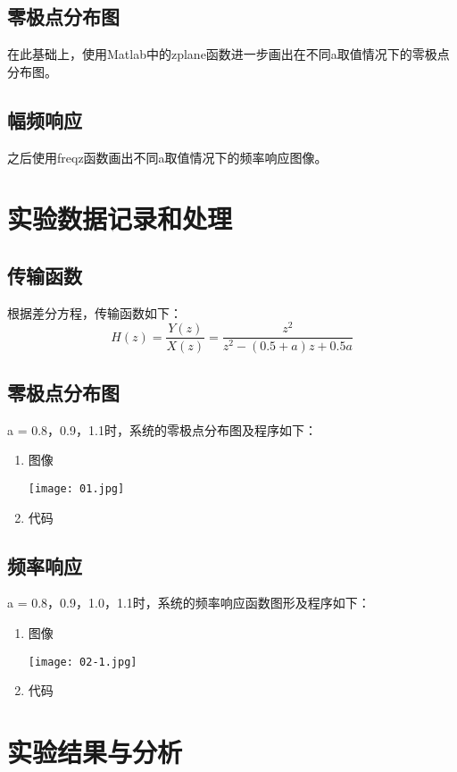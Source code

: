 \documentclass{hitreport}
\begin{document}
\subsection{零极点分布图}
在此基础上，使用Matlab中的zplane函数进一步画出在不同a取值情况下的零极点分布图。
\subsection{幅频响应}
之后使用freqz函数画出不同a取值情况下的频率响应图像。

\section{实验数据记录和处理}
\subsection{传输函数}
根据差分方程，传输函数如下：
$$H(z) = \frac{Y(z)}{X(z)} = \frac{z^2}{z^2-(0.5+a)z+0.5a}$$
\subsection{零极点分布图}
a = 0.8，0.9，1.1时，系统的零极点分布图及程序如下：
\begin{enumerate}
  \item 图像
        \begin{center}
          \texttt{[image: 01.jpg]}
        \end{center}
  \item 代码
        
\end{enumerate}

\subsection{频率响应}
a = 0.8，0.9，1.0，1.1时，系统的频率响应函数图形及程序如下：
\begin{enumerate}
  \item 图像
        \begin{center}
          \texttt{[image: 02-1.jpg]}
        \end{center}
  \item 代码
        
\end{enumerate}

\section{实验结果与分析}
\end{document}
